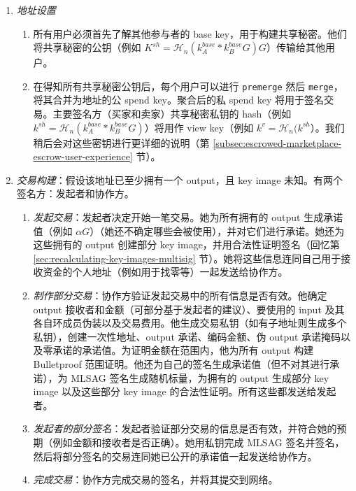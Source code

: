\begin{enumerate}
    \item {\em 地址设置}
    \begin{enumerate}
        \item 所有用户必须首先了解其他参与者的 base key，用于构建共享秘密。他们将共享秘密的公钥（例如 $K^{sh} = \mathcal{H}_n(k^{base}_A*k^{base}_B G) G$）传输给其他用户。
        \item 在得知所有共享秘密公钥后，每个用户可以进行 {\tt premerge} 然后 {\tt merge}，将其合并为地址的公 spend key。聚合后的私 spend key 将用于签名交易。主要签名方（买家和卖家）共享秘密私钥的 hash（例如 $k^{sh} = \mathcal{H}_n(k^{base}_A*k^{base}_B G)$）将用作 view key（例如 $k^v = \mathcal{H}_n(k^{sh}$）。我们稍后会对这些密钥进行更详细的说明（第 \ref{subsec:escrowed-marketplace-escrow-user-experience} 节）。
    \end{enumerate}{}
    \item {\em 交易构建}：假设该地址已至少拥有一个 output，且 key image 未知。有两个签名方：发起者和协作方。
    \begin{enumerate}
        \item {\em 发起交易}：发起者决定开始一笔交易。她为所有拥有的 output 生成承诺值（例如 $\alpha G$）（她还不确定哪些会被使用），并对它们进行承诺。她还为这些拥有的 output 创建部分 key image，并用合法性证明签名（回忆第 \ref{sec:recalculating-key-images-multisig} 节）。她将这些信息连同自己用于接收资金的个人地址（例如用于找零等）一起发送给协作方。
        \item {\em 制作部分交易}：协作方验证发起交易中的所有信息是否有效。他确定 output 接收者和金额（可部分基于发起者的建议）、要使用的 input 及其各自环成员伪装以及交易费用。他生成交易私钥（如有子地址则生成多个私钥），创建一次性地址、output 承诺、编码金额、伪 output 承诺掩码以及零承诺的承诺值。为证明金额在范围内，他为所有 output 构建 Bulletproof 范围证明。他还为自己的签名生成承诺值（但不对其进行承诺），为 MLSAG 签名生成随机标量，为拥有的 output 生成部分 key image 以及这些部分 key image 的合法性证明。所有这些都发送给发起者。
        \item {\em 发起者的部分签名}：发起者验证部分交易的信息是否有效，并符合她的预期（例如金额和接收者是否正确）。她用私钥完成 MLSAG 签名并签名，然后将部分签名的交易连同她已公开的承诺值一起发送给协作方。
        \item {\em 完成交易}：协作方完成交易的签名，并将其提交到网络。
    \end{enumerate}{}
\end{enumerate}{}

